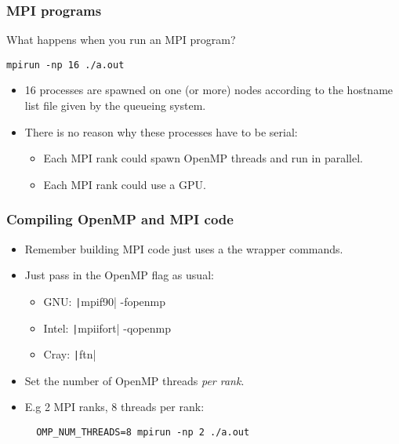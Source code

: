 \documentclass{beamer}
\begin{document}
\begin{frame}[fragile]
\frametitle{MPI programs}
What happens when you run an MPI program?
\begin{verbatim}
mpirun -np 16 ./a.out
\end{verbatim}

\begin{itemize}
  \item 16 processes are spawned on one (or more) nodes according to the hostname list file given by the queueing system.
  \item There is no reason why these processes have to be serial:
  \begin{itemize}
    \item Each MPI rank could spawn OpenMP threads and run in parallel.
    \item Each MPI rank could use a GPU.
  \end{itemize}
\end{itemize}

\end{frame}

\begin{frame}[fragile]
\frametitle{Compiling OpenMP and MPI code}
\begin{itemize}
  \item Remember building MPI code just uses a the wrapper commands.
  \item Just pass in the OpenMP flag as usual:
    \begin{itemize}
      \item GNU: \texttt|mpif90| -fopenmp
      \item Intel: \texttt|mpiifort| -qopenmp
      \item Cray: \texttt|ftn|
    \end{itemize}
  \item Set the number of OpenMP threads \emph{per rank}.
  \item E.g 2 MPI ranks, 8 threads per rank:
  \begin{verbatim}
  OMP_NUM_THREADS=8 mpirun -np 2 ./a.out
  \end{verbatim}
\end{itemize}
\end{frame}
\end{document}
